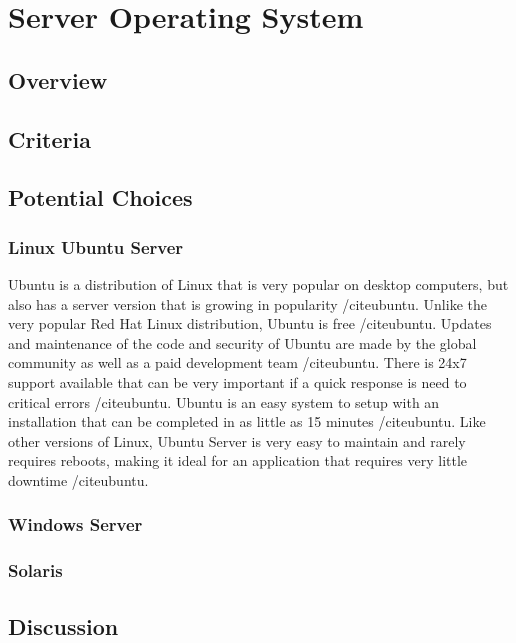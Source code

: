 \documentclass[onecolumn, draftclsnofoot,10pt, compsoc]{IEEEtran}
\begin{document}
\section{Server Operating System}

\subsection{Overview}

\subsection{Criteria}

\subsection{Potential Choices}

\subsubsection{Linux Ubuntu Server}
Ubuntu is a distribution of Linux that is very popular on desktop computers, but also has a server version that is growing in popularity /cite{ubuntu}. Unlike the very popular Red Hat Linux distribution, Ubuntu is free /cite{ubuntu}. Updates and maintenance of the code and security of Ubuntu are made by the global community as well as a paid development team /cite{ubuntu}. There is 24x7 support available that can be very important if a quick response is need to critical errors /cite{ubuntu}. Ubuntu is an easy system to setup with an installation that can be completed in as little as 15 minutes /cite{ubuntu}. Like other versions of Linux, Ubuntu Server is very easy to maintain and rarely requires reboots, making it ideal for an application that requires very little downtime /cite{ubuntu}. 

\subsubsection{Windows Server}

\subsubsection{Solaris}

\subsection{Discussion}
\end{document}
